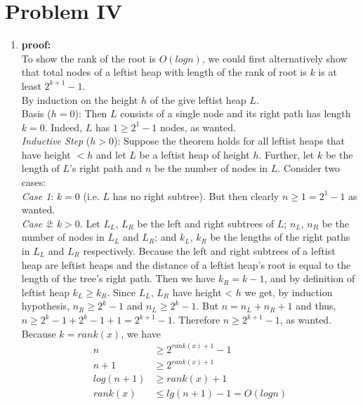 \section{Problem IV}

\begin{enumerate}[label=(\alph*)]
	\item \textbf{proof:} \\
	To show the rank of the root is $O(logn)$, we could first alternatively show that total nodes of a leftist heap with length of the rank of root is $k$ is at least $2^{k + 1} - 1$.\\

	By induction on the height $h$ of the give leftist heap $L$.\\

	Basis ($h=0$): Then $L$ consists of a single node and its right path has length $k=0$. Indeed, $L$ has $1 \geq 2^{1} - 1$ nodes, as wanted.\\

	\textit{Inductive Step} ($h>0$): Suppose the theorem holds for all leftist heaps that have height $< h$ and let $L$ be a leftist heap of height $h$. Further, let $k$ be the length of $L$'s right path and $n$ be the number of nodes in $L$. Consider two cases:\\

	\textit{Case 1}: $k=0$ (i.e. $L$ has no right subtree). But then clearly $n \geq 1 = 2^1 - 1$ as wanted.\\

	\textit{Case 2}: $k>0$. Let $L_L$, $L_R$ be the left and right subtrees of $L$; $n_L$, $n_R$ be the number of nodes in $L_L$ and $L_R$; and $k_L$, $k_R$ be the lengths of the right paths in $L_L$ and $L_R$ respectively. Because the left and right subtrees of a leftist heap are leftist heaps and the distance of a leftist heap's root is equal to the length of the tree's right path. Then we have $k_R = k - 1$, and by definition of leftist heap $k_L \geq k_R$. Since $L_L$, $L_R$ have height < $h$ we get, by induction hypothesis, $n_R \geq 2^k - 1$ and $n_L \geq 2^k - 1$. But $n = n_L + n_R +1$ and thus, $n \geq 2^k - 1 + 2^k - 1 + 1 =2^{k+1} - 1$. Therefore $n \geq 2^{k+1} - 1$, as wanted. Because $k = rank(x)$, we have
	\begin{align*}
	n &\geq 2^{rank(x) + 1} - 1\\
	n + 1 &\geq 2^{rank(x) + 1}\\
	log(n + 1) &\geq rank(x) + 1\\
	rank(x) &\leq lg(n + 1) - 1 = O(logn) 
	\end{align*}


\end{enumerate}
